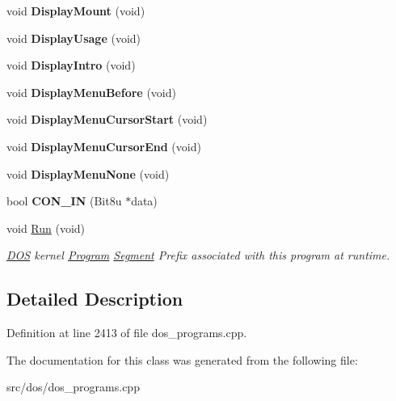 \begin{DoxyCompactItemize}
\item 
\hypertarget{classINTRO_a5c6e294e686b9c667e58bd2ca8e13bb4}{void {\bfseries Display\-Mount} (void)}\label{classINTRO_a5c6e294e686b9c667e58bd2ca8e13bb4}

\item 
\hypertarget{classINTRO_a4857619c9d351417a9a8c87b29bed52c}{void {\bfseries Display\-Usage} (void)}\label{classINTRO_a4857619c9d351417a9a8c87b29bed52c}

\item 
\hypertarget{classINTRO_a3e68c8cde2fce914c656154f273f7149}{void {\bfseries Display\-Intro} (void)}\label{classINTRO_a3e68c8cde2fce914c656154f273f7149}

\item 
\hypertarget{classINTRO_a0c242eac779e67c6168613e6b2a81290}{void {\bfseries Display\-Menu\-Before} (void)}\label{classINTRO_a0c242eac779e67c6168613e6b2a81290}

\item 
\hypertarget{classINTRO_a53f19e5f292278bcd847a8a44b0bdc5d}{void {\bfseries Display\-Menu\-Cursor\-Start} (void)}\label{classINTRO_a53f19e5f292278bcd847a8a44b0bdc5d}

\item 
\hypertarget{classINTRO_a3ed7b89911f2fbd3f0b5a8412d9d91c5}{void {\bfseries Display\-Menu\-Cursor\-End} (void)}\label{classINTRO_a3ed7b89911f2fbd3f0b5a8412d9d91c5}

\item 
\hypertarget{classINTRO_a83e703c1fe7702783fbd1ce1320235a6}{void {\bfseries Display\-Menu\-None} (void)}\label{classINTRO_a83e703c1fe7702783fbd1ce1320235a6}

\item 
\hypertarget{classINTRO_ab717779f33410fb437dfb3b82fcf8e65}{bool {\bfseries C\-O\-N\-\_\-\-I\-N} (Bit8u $\ast$data)}\label{classINTRO_ab717779f33410fb437dfb3b82fcf8e65}

\item 
\hypertarget{classINTRO_a7fe083b2cab4fe79e280b030cc542fd3}{void \hyperlink{classINTRO_a7fe083b2cab4fe79e280b030cc542fd3}{Run} (void)}\label{classINTRO_a7fe083b2cab4fe79e280b030cc542fd3}

\begin{DoxyCompactList}\small\item\em \hyperlink{classDOS}{D\-O\-S} kernel \hyperlink{classProgram}{Program} \hyperlink{structSegment}{Segment} Prefix associated with this program at runtime. \end{DoxyCompactList}\end{DoxyCompactItemize}


\subsection{Detailed Description}


Definition at line 2413 of file dos\-\_\-programs.\-cpp.



The documentation for this class was generated from the following file\-:\begin{DoxyCompactItemize}
\item 
src/dos/dos\-\_\-programs.\-cpp\end{DoxyCompactItemize}
